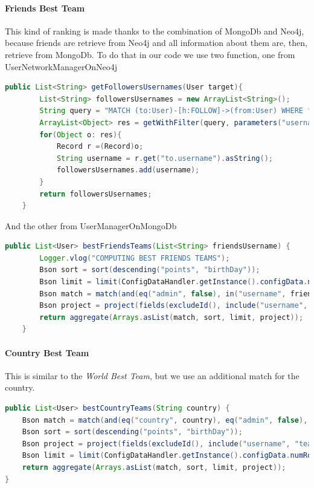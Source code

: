 \paragraph{Friends Best Team}
This kind of ranking is made thanks to the combination of MongoDb and Neo4j, because friends are retrieve from Neo4j and all information about them are, then, retrieve from MongoDb. To do that in our code we use two function, one from UserNetworkManagerOnNeo4j

\begin{lstlisting}[language=Java]
	public List<String> getFollowersUsernames(User target){
		List<String> followersUsernames = new ArrayList<String>();
		String query = "MATCH (to:User)-[h:FOLLOW]->(from:User) WHERE from.username = $username RETURN to.username";
		ArrayList<Object> res = getWithFilter(query, parameters("username", target.getUsername()));
		for(Object o: res){
			Record r =(Record)o;
			String username = r.get("to.username").asString();
			followersUsernames.add(username);
		}
		return followersUsernames;
	}
\end{lstlisting}

And the other from UserManagerOnMongoDb

\begin{lstlisting}[language=Java]
	public List<User> bestFriendsTeams(List<String> friendsUsername) {
		Logger.vlog("COMPUTING BEST FRIENDS TEAMS");
		Bson sort = sort(descending("points", "birthDay"));
		Bson limit = limit(ConfigDataHandler.getInstance().configData.numRowsRanking);
		Bson match = match(and(eq("admin", false), in("username", friendsUsername), lte("lastLogin", getDateThresholdForRanking())));
		Bson project = project(fields(excludeId(), include("username", "teamName", "points", "birthDay", "country")));
		return aggregate(Arrays.asList(match, sort, limit, project));
	}
\end{lstlisting}

\paragraph{Country Best Team}
This is similar to the \textit{World Best Team}, but we use an additional match for the country.

\begin{lstlisting}[language=Java]
public List<User> bestCountryTeams(String country) {
	Bson match = match(and(eq("country", country), eq("admin", false), lte("lastLogin", getDateThresholdForRanking())));
	Bson sort = sort(descending("points", "birthDay"));
	Bson project = project(fields(excludeId(), include("username", "teamName", "points", "birthDay", "country")));
	Bson limit = limit(ConfigDataHandler.getInstance().configData.numRowsRanking);
	return aggregate(Arrays.asList(match, sort, limit, project));
}

\end{lstlisting}


